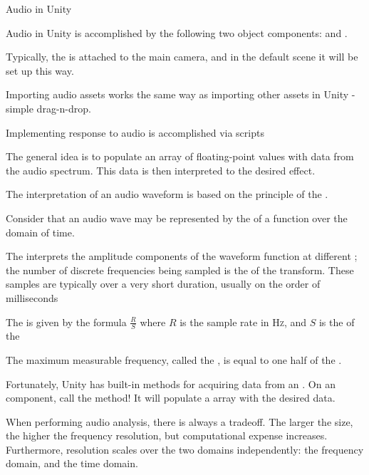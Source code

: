 \documentclass[11pt]{article}
\begin{document}
\maketitle

\begin{topic}{Audio in Unity}
	\item Audio in Unity is accomplished by the following two object components:  and .
	\item Typically, the  is attached to the main camera, and in the default scene it will be set up this way.
	\item Importing audio assets works the same way as importing other assets in Unity - simple drag-n-drop.
	\item Implementing  response to audio is accomplished via scripts
	\item The general idea is to populate an array of floating-point values with data from the audio spectrum. This data is then interpreted to the desired effect.
	\item The interpretation of an audio waveform is based on the principle of the .
	\item Consider that an audio wave may be represented by the  of a function over the domain of time.
	\item The  interprets the amplitude components of the waveform function at different ; the number of discrete frequencies being sampled is the  of the transform. These samples are typically over a very short duration, usually on the order of milliseconds
	\item The  is given by the formula $\frac{R}{S}$ where $R$ is the sample rate in \textsc{Hz}, and $S$ is the  of the 
	\item The maximum measurable frequency, called the , is equal to one half of the .
	\item Fortunately, Unity has built-in methods for acquiring  data from an . On an  component, call the  method! It will populate a  array with the desired data.
	\item When performing audio analysis, there is always a tradeoff. The larger the  size, the higher the frequency resolution, but computational expense increases. Furthermore, resolution scales over the two domains independently: the frequency domain, and the time domain.
\end{topic}
\end{document}

